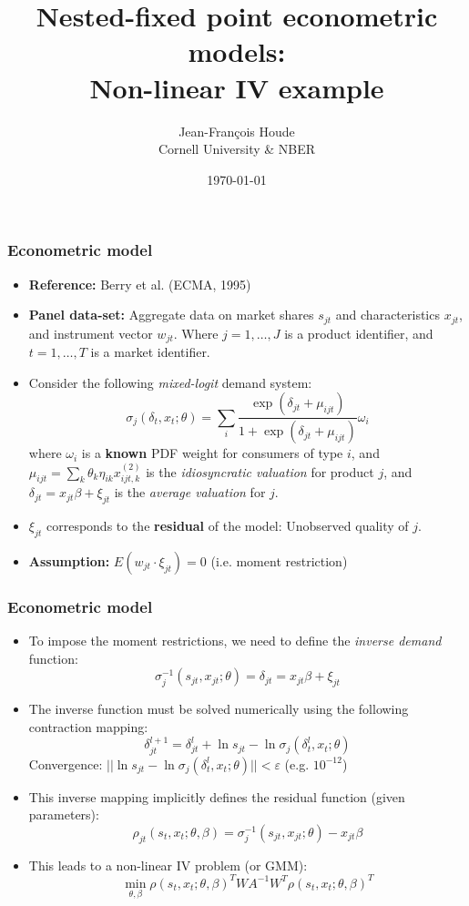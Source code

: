 \documentclass[handout]{beamer}
\title{Nested-fixed point econometric models: \\ Non-linear IV example}
\author{Jean-Fran\c{c}ois Houde \\ Cornell University \& NBER}
\date{\today}
\theoremstyle{plain}
\begin{document}
\maketitle

\begin{frame}
\frametitle{Econometric model}
\begin{itemize}
\item {\bf Reference:} Berry et al. (ECMA, 1995)
\item {\bf Panel data-set:} Aggregate data on market shares $s_{jt}$ and characteristics $x_{jt}$, and instrument vector $w_{jt}$. Where $j=1,\dots,J$ is a product identifier, and $t=1,\dots,T$ is a market identifier.
\item Consider the following {\it mixed-logit} demand system:
$$\sigma_{j}(\delta_t,x_t;\theta)=\sum_i \frac{\exp(\delta_{jt}+\mu_{ijt})}{1+\exp(\delta_{jt}+\mu_{ijt})}\omega_i$$
where $\omega_i$ is a {\bf known} PDF weight for consumers of type $i$, and $\mu_{ijt}=\sum_k \theta_k\eta_{ik}x^{(2)}_{ijt,k}$ is the {\it idiosyncratic valuation} for product $j$, and $\delta_{jt}=x_{jt}\beta+\xi_{jt}$ is the {\it average valuation} for $j$.
\item $\xi_{jt}$ corresponds to the {\bf residual} of the model: Unobserved quality of $j$.
\item {\bf Assumption:} $E(w_{jt}\cdot \xi_{jt})=0$ (i.e. moment restriction)
\end{itemize}
\end{frame}

\begin{frame}
\frametitle{Econometric model}
\begin{itemize}
\item To impose the moment restrictions, we need to define the {\it inverse demand} function:
$$\sigma_{j}^{-1}(s_{jt},x_{jt};\theta)=\delta_{jt}=x_{jt}\beta+\xi_{jt}$$
\item The inverse function must be solved numerically using the following contraction mapping:
$$\delta_{jt}^{l+1}=\delta_{jt}^l+\ln s_{jt}-\ln \sigma_j(\delta_t^l,x_t;\theta)$$
Convergence: $||\ln s_{jt}-\ln \sigma_j(\delta_t^l,x_t;\theta)||<\varepsilon$ (e.g. $10^{-12}$)
\item This inverse mapping implicitly defines the residual function (given parameters):
$$\rho_{jt}(s_t,x_t;\theta,\beta)=\sigma_{j}^{-1}(s_{jt},x_{jt};\theta)-x_{jt}\beta$$
\item This leads to a non-linear IV problem (or GMM):
$$\min_{\theta,\beta} \rho(s_t,x_t;\theta,\beta)^TWA^{-1}W^T\rho(s_t,x_t;\theta,\beta)^T$$
\end{itemize}
\end{frame}
\end{document}
